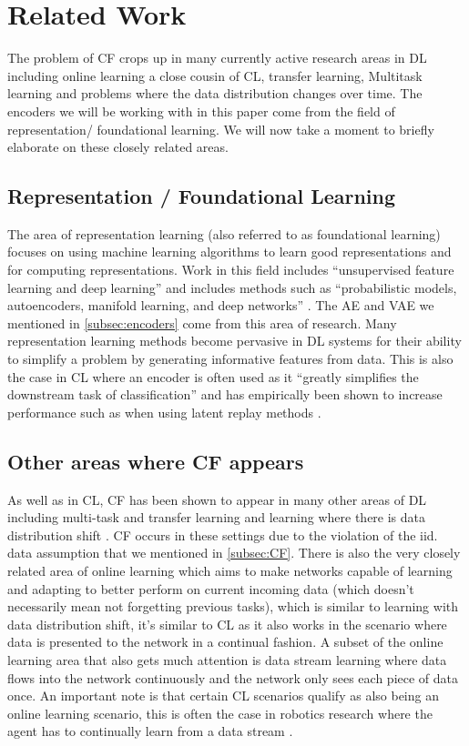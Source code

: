 \section{Related Work}
\label{sec:related}
The problem of CF crops up in many currently active research areas in DL including online learning a close cousin of CL, transfer learning, Multitask learning and problems where the data distribution changes over time. The encoders we will be working with in this paper come from the field of representation/ foundational learning. We will now take a moment to briefly elaborate on these closely related areas.

\subsection{Representation / Foundational Learning}
The area of representation learning (also referred to as foundational learning) focuses on using machine learning algorithms to learn good representations and for computing representations. Work in this field includes ``unsupervised feature learning and deep learning'' and includes methods such as ``probabilistic models, autoencoders, manifold learning, and deep networks'' \cite{bengio2013representation}. The AE and VAE we mentioned in \ref{subsec:encoders} come from this area of research. Many representation learning methods become pervasive in DL systems for their ability to simplify a problem by generating informative features from data. This is also the case in CL where an encoder is often used as it ``greatly simplifies
the downstream task of classification'' \cite{shanahan2021encoders} and has empirically been shown to increase performance such as when using latent replay methods \cite{ostapenko2022continual}. 

\subsection{Other areas where CF appears}
As well as in CL, CF has been shown to appear in many other areas of DL including multi-task and transfer learning \cite{kudugunta2019investigating} and learning where there is data distribution shift \cite{toneva2018empirical,rabanser2019failing}. CF occurs in these settings due to the violation of the iid. data assumption that we mentioned in \ref{subsec:CF}. There is also the very closely related area of online learning \cite{jain2014review} which aims to make networks capable of learning and adapting to better perform on current incoming data (which doesn't necessarily mean not forgetting previous tasks), which is similar to learning with data distribution shift, it's similar to CL as it also works in the scenario where data is presented to the network in a continual fashion. A subset of the online learning area that also gets much attention is data stream learning \cite{gama2012survey} where data flows into the network continuously and the network only sees each piece of data once. An important note is that certain CL scenarios qualify as also being an online learning scenario, this is often the case in robotics research where the agent has to continually learn from a data stream \cite{lesort2020continual}.